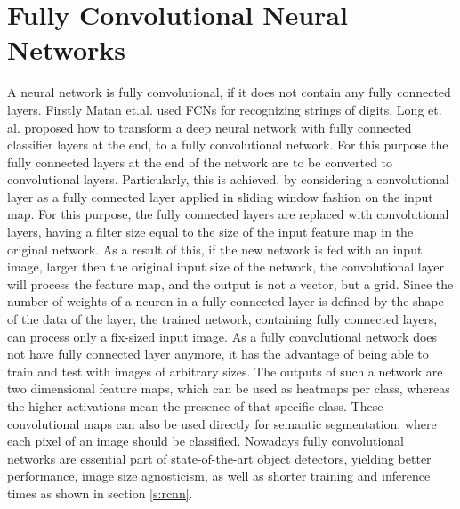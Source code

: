 \section{Fully Convolutional Neural Networks}\label{s:fullyconvnet}
A neural network is fully convolutional, if it does not contain any fully connected layers. Firstly Matan et.al. used FCNs for recognizing strings of digits. Long et. al. proposed \cite{DBLP:journals/corr/LongSD14} how to transform a deep neural network with fully connected classifier layers at the end, to a fully convolutional network. For this purpose the fully connected layers at the end of the network are to be converted to convolutional layers. Particularly, this is achieved, by considering a convolutional layer as a fully connected layer applied in sliding window fashion on the input map. For this purpose, the fully connected layers are replaced with convolutional layers, having a filter size equal to the size of the input feature map in the original network. As a result of this, if the new network is fed with an input image, larger then the original input size of the network, the convolutional layer will process the feature map, and the output is not a vector, but a grid.
\bigbreak
Since the number of weights of a neuron in a fully connected layer is defined by the shape of the data of the layer, the trained network, containing fully connected layers, can process only a fix-sized input image. As a fully convolutional network does not have fully connected layer anymore, it has the advantage of being able to train and test with images of arbitrary sizes.
\bigbreak
The outputs of such a network are two dimensional feature maps, which can be used as heatmaps per class, whereas the higher activations mean the presence of that specific class. These convolutional maps can also be used directly for semantic segmentation, where each pixel of an image should be classified.
Nowadays fully convolutional networks are essential part of state-of-the-art object detectors, yielding better performance, image size agnosticism, as well as shorter training and inference times as shown in section \ref{s:rcnn}.
\bigbreak

